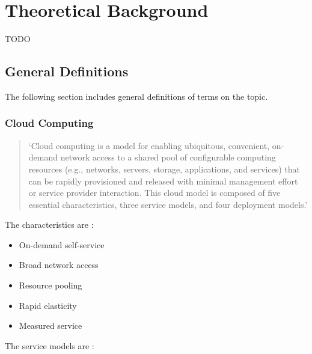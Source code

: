 \chapter{Theoretical Background} 	%
\label{theoretical-background}


{\color{red}TODO}


\section{General Definitions}
\label{theoretical-background:general-definitions}

The following section includes general definitions of terms on the topic.

\subsection*{Cloud Computing}

\begin{quotation}
\noindent
\enquote*{Cloud computing is a model for enabling ubiquitous, convenient, on-demand network access to a shared
	pool of configurable computing resources (e.g., networks, servers, storage, applications, and services) that
	can be rapidly provisioned and released with minimal management effort or service provider interaction.
	This cloud model is composed of five essential characteristics, three service models, and four deployment
	models.}
\autocite{cloudComputingNistDefinition2011}
\end{quotation}

The characteristics are
\autocite{cloudComputingNistDefinition2011}:

\begin{itemize}
	\item On-demand self-service
	\item Broad network access
	\item Resource pooling
	\item Rapid elasticity
	\item Measured service
\end{itemize}

The service models are
\autocite{cloudComputingNistDefinition2011}:

